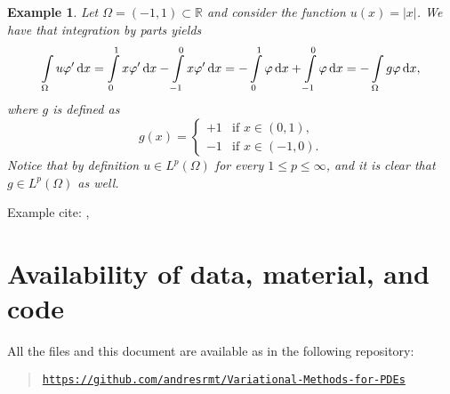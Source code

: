 \documentclass[a4paper,doc,11pt]{article}
\newtheorem{example}[theorem]{Example}
\newcommand{\R}{\mathbb{R}}
\begin{document}
\begin{example}
    Let \(\Omega = (-1,1) \subset \R\) and consider the function \( u(x) = |x|\). We have that integration by parts yields
    \begin{align*}
        \int\limits_\Omega u \varphi' \dif x
        =
        \int\limits_{0}^1 x \varphi'  \dif x
        -
        \int\limits_{-1}^0 x \varphi'  \dif x
        = 
        -\int\limits_{0}^1 \varphi  \dif x
        +
        \int\limits_{-1}^0 \varphi  \dif x
        =
        -\int\limits_\Omega g \varphi \dif x,
    \end{align*}
    where \(g\) is defined as
    \[
        g(x) = 
        \begin{cases}
            +1 & \text{if } x\in (0,1),
            \\
            -1 & \text{if } x\in (-1,0).
        \end{cases}
    \]
    Notice that by definition \(u\in L^p(\Omega)\) for every \(1 \leq p\leq \infty \), and it is clear that \(g \in L^p (\Omega)\) as well. 
\end{example}







\vspace{2\baselineskip}

Example cite:
\citet{Yann1991}, \citep{Yann1991}







\section*{Availability of data, material, and code}
{

All the files and this document are available as in the following repository:
\begin{quote}
    \noindent \href{https://github.com/andresrmt/Variational-Methods-for-PDEs}{\texttt{https://github.com/andresrmt/Variational-Methods-for-PDEs}}
\end{quote}



}

\newpage



\end{document}

